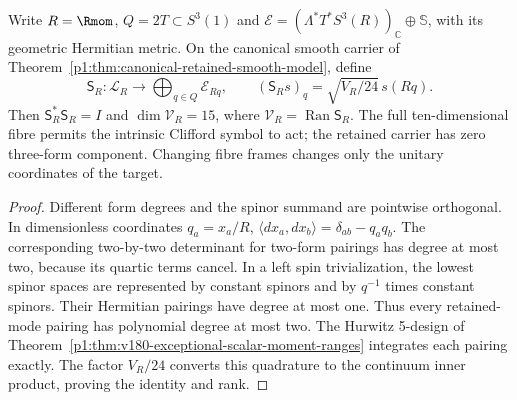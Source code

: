 \documentclass[11pt]{article}
\begin{document}
\begin{theorem}
\label{p1:thm:v203-full-carrier-sampling}
Write $R=\Rmom$, $Q=2T\subset S^3(1)$ and
$\mathcal E=(\Lambda^*T^*S^3(R))_{\mathbb C}\oplus\mathbb S$, with its
geometric Hermitian metric. On the canonical smooth carrier of
Theorem~\ref{p1:thm:canonical-retained-smooth-model}, define
\[
 \mathsf S_R:\mathcal L_R\longrightarrow\bigoplus_{q\in Q}\mathcal E_{Rq},
 \qquad (\mathsf S_Rs)_q=\sqrt{V_R/24}\,s(Rq).
\]
Then $\mathsf S_R^*\mathsf S_R=I$ and
$\dim\mathcal V_R=15$, where $\mathcal V_R=\operatorname{Ran}\mathsf S_R$.
The full ten-dimensional fibre permits the intrinsic Clifford symbol to
act; the retained carrier has zero three-form component. Changing fibre
frames changes only the unitary coordinates of the target.
\end{theorem}
\begin{proof}
Different form degrees and the spinor summand are pointwise orthogonal.
In dimensionless coordinates $q_a=x_a/R$,
$\langle dx_a,dx_b\rangle=\delta_{ab}-q_aq_b$. The corresponding
two-by-two determinant for two-form pairings has degree at most two,
because its quartic terms cancel. In a left spin trivialization, the
lowest spinor spaces are represented by constant spinors and by $q^{-1}$
times constant spinors. Their Hermitian pairings have degree at most one.
Thus every retained-mode pairing has polynomial degree at most two.
The Hurwitz 5-design of
Theorem~\ref{p1:thm:v180-exceptional-scalar-moment-ranges} integrates each
pairing exactly. The factor $V_R/24$ converts this quadrature to the
continuum inner product, proving the identity and rank.
\end{proof}
\end{document}
